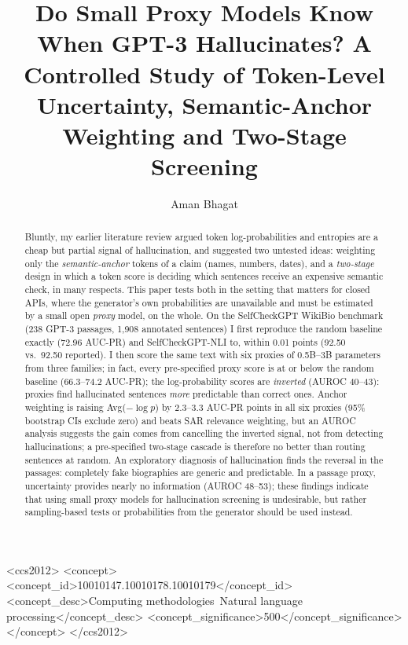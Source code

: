 \documentclass[acmsmall,screen,review,nonacm]{acmart}
\begin{document}
\title[Proxy Token Uncertainty for Hallucination Detection]{Do Small Proxy Models Know When GPT-3 Hallucinates? A Controlled Study of Token-Level Uncertainty, Semantic-Anchor Weighting and Two-Stage Screening}

\author{Aman Bhagat}
\renewcommand{\shortauthors}{Aman Bhagat}

\begin{abstract}
Bluntly, my earlier literature review argued token log-probabilities and entropies are a cheap but partial signal of hallucination, and suggested two untested ideas: weighting only the \emph{semantic-anchor} tokens of a claim (names, numbers, dates), and a \emph{two-stage} design in which a token score is deciding which sentences receive an expensive semantic check, in many respects. This paper tests both in the setting that matters for closed APIs, where the generator's own probabilities are unavailable and must be estimated by a small open \emph{proxy} model, on the whole. On the SelfCheckGPT WikiBio benchmark (238 GPT-3 passages, 1{,}908 annotated sentences) I first reproduce the random baseline exactly (72.96 AUC-PR) and SelfCheckGPT-NLI to, within 0.01 points (92.50 vs.\ 92.50 reported). I then score the same text with six proxies of 0.5B--3B parameters from three families; in fact, every pre-specified proxy score is at or below the random baseline (66.3--74.2 AUC-PR); the log-probability scores are \emph{inverted} (AUROC 40--43): proxies find hallucinated sentences \emph{more} predictable than correct ones. Anchor weighting is raising Avg($-\log p$) by 2.3--3.3 AUC-PR points in all six proxies (95\% bootstrap CIs exclude zero) and beats SAR relevance weighting, but an AUROC analysis suggests the gain comes from cancelling the inverted signal, not from detecting hallucinations; a pre-specified two-stage cascade is therefore no better than routing sentences at random. An exploratory diagnosis of hallucination finds the reversal in the passages: completely fake biographies are generic and predictable. In a passage proxy, uncertainty provides nearly no information (AUROC 48–53); these findings indicate that using small proxy models for hallucination screening is undesirable, but rather sampling-based tests or probabilities from the generator should be used instead.
\end{abstract}

\begin{CCSXML}
<ccs2012>
 <concept>
  <concept_id>10010147.10010178.10010179</concept_id>
  <concept_desc>Computing methodologies~Natural language processing</concept_desc>
  <concept_significance>500</concept_significance>
 </concept>
</ccs2012>
\end{CCSXML}
\end{document}
